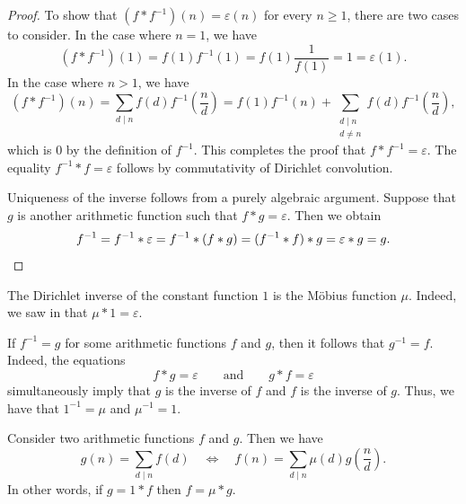 \begin{proof}
  To show that $(f\ast f^{-1})(n)=\varepsilon(n)$ for every $n\geq 1$, there are two cases to consider. In the case where $n=1$, we have
  \begin{equation*}
    (f\ast f^{-1})(1) = f(1)f^{-1}(1) = f(1)\frac{1}{f(1)} = 1 = \varepsilon(1).
  \end{equation*}
  In the case where $n>1$,  we have
  \begin{equation*}
    (f\ast f^{-1})(n) = \sum_{d\mid n}f(d)f^{-1}\left(\frac{n}{d}\right)= f(1)f^{-1}(n)+ \sum_{\substack{d\mid n \\ d\neq n}}f(d)f^{-1}\left(\frac{n}{d}\right),
  \end{equation*}
  which is $0$ by the definition of $f^{-1}$. This completes the proof that $f\ast f^{-1}=\varepsilon$. The equality $f^{-1}\ast f=\varepsilon$ follows by commutativity of Dirichlet convolution.

  Uniqueness of the inverse follows from a purely algebraic argument. Suppose that $g$ is another arithmetic function such that $f\ast g=\varepsilon$. Then we obtain
  \begin{equation*}
    f^{-1} = f^{-1} \ast \varepsilon = f^{-1}\ast (f\ast g) = (f^{-1}\ast f)\ast g = \varepsilon \ast g = g.\qedhere
  \end{equation*}
\end{proof}

\begin{example}
  The Dirichlet inverse of the constant function $1$ is the M\"obius function $\mu$. Indeed, we saw in  that $\mu\ast 1=\varepsilon$.
\end{example}

\begin{remark}
  If $f^{-1}=g$ for some arithmetic functions $f$ and $g$, then it follows that $g^{-1}=f$. Indeed, the equations
  \begin{equation*}
    f\ast g=\varepsilon\qquad\text{and}\qquad g\ast f=\varepsilon
  \end{equation*}
  simultaneously imply that $g$ is the inverse of $f$ and $f$ is the inverse of $g$. Thus, we have that $1^{-1}=\mu$ and $\mu^{-1}=1$.
\end{remark}

\begin{theorem}
  Consider two arithmetic functions $f$ and $g$. Then we have
  \begin{equation*}
    g(n)=\sum_{d\mid n}f(d)\quad\Leftrightarrow\quad f(n)=\sum_{d\mid n}\mu(d)g\left(\frac{n}{d}\right).
  \end{equation*}
  In other words, if $g=1\ast f$ then $f=\mu\ast g$.
\end{theorem}

